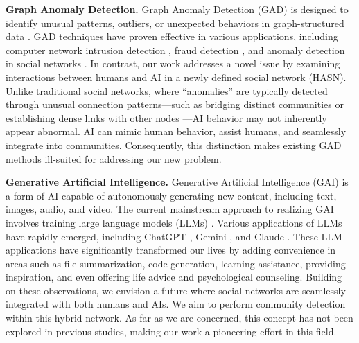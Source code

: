 \noindent\textbf{Graph Anomaly Detection.} Graph Anomaly Detection (GAD) is designed to identify unusual patterns, outliers, or unexpected behaviors in graph-structured data \cite{ma2021comprehensive}\cite{lamichhane2024anomaly}. GAD techniques have proven effective in various applications, including computer network intrusion detection \cite{bilot2023graph}, fraud detection \cite{xiang2023semi}, and anomaly detection in social networks \cite{yu2016survey}\cite{roy2024gad}. In contrast, our work addresses a novel issue by examining interactions between humans and AI in a newly defined social network (HASN). Unlike traditional social networks, where “anomalies” are typically detected through unusual connection patterns—such as bridging distinct communities or establishing dense links with other nodes \cite{ma2021comprehensive}—AI behavior may not inherently appear abnormal. AI can mimic human behavior, assist humans, and seamlessly integrate into communities. Consequently, this distinction makes existing GAD methods ill-suited for addressing our new problem.

\noindent\textbf{Generative Artificial Intelligence.} Generative Artificial Intelligence (GAI) is a form of AI capable of autonomously generating new content, including text, images, audio, and video. The current mainstream approach to realizing GAI involves training large language models (LLMs) \cite{guo2024large}. Various applications of LLMs have rapidly emerged, including ChatGPT \cite{achiam2023gpt}, Gemini \cite{team2023gemini}, and Claude \cite{AnthropicAI2023}. These LLM applications have significantly transformed our lives by adding convenience in areas such as file summarization, code generation, learning assistance, providing inspiration, and even offering life advice and psychological counseling. Building on these observations, we envision a future where social networks are seamlessly integrated with both humans and AIs. We aim to perform community detection within this hybrid network. As far as we are concerned, this concept has not been explored in previous studies, making our work a pioneering effort in this field.

















